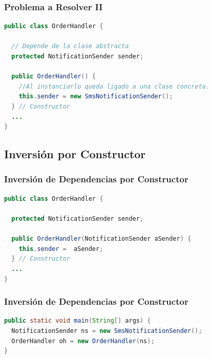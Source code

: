 \documentclass[a4paper,t,xcolor=pst,dvips,colortheme]{beamer}
\begin{document}


\begin{frame}[c,fragile]
	\frametitle{Problema a Resolver II}
\begin{lstlisting}[basicstyle=\footnotesize,language=Java]
public class OrderHandler {

  // Depende de la clase abstracta
  protected NotificationSender sender;

  public OrderHandler() {
    //Al instanciarlo queda ligado a una clase concreta.
    this.sender = new SmsNotificationSender();
  } // Constructor
  ...
}
\end{lstlisting}
\end{frame}

\subsection{Inversión por Constructor}

\begin{frame}[c,fragile]
	\frametitle{Inversión de Dependencias por Constructor}
\begin{lstlisting}[basicstyle=\footnotesize,language=Java]
public class OrderHandler {

  protected NotificationSender sender;
	
  public OrderHandler(NotificationSender aSender) {
	this.sender =  aSender;
  } // Constructor
  ...
}
\end{lstlisting}
\end{frame}

\begin{frame}[c,fragile]
	\frametitle{Inversión de Dependencias por Constructor}
\begin{lstlisting}[basicstyle=\footnotesize,language=Java]
public static void main(String[] args) {
  NotificationSender ns = new SmsNotificationSender();
  OrderHandler oh = new OrderHandler(ns);
}
\end{lstlisting}
\end{frame}
\end{document}
